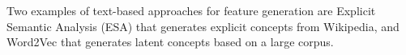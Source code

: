 \documentclass{article}
\theoremstyle{definition}
\begin{document}
Two examples of text-based approaches for feature generation are 
Explicit Semantic Analysis (ESA) \citep{gabrilovich2009wikipediafull} that generates explicit concepts from Wikipedia, and Word2Vec \citep{mikolov2013distributed} that generates latent concepts based on a large corpus. 


\end{document}
